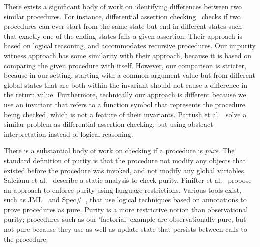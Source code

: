 There exists a significant body of work on identifying differences between
two similar procedures. For instance, differential assertion
checking~\cite{lahiri2013differential} checks if two procedures can ever
start from the same state but end in different states such that exactly one
of the ending states fails a given assertion. Their approach is based on
logical reasoning, and accommodates recursive procedures. Our impurity
witness approach has some similarity with their approach, because it is
based on comparing the given procedure with itself. However, our comparison
is stricter, because in our setting, starting with a common argument value
but from different global states that are both within the invariant should
not cause a difference in the return value. Furthermore, technically our
approach is different because we use an invariant that refers to a function
symbol that represents the procedure being checked, which is not a feature
of their invariants. Partush et al.~\cite{partush2013abstract} solve a
similar problem as differential assertion checking, but using abstract
interpretation instead of logical reasoning.

There is a substantial body of work on checking if a procedure is
\emph{pure}. The standard definition of purity is that the procedure not
modify any objects that existed before the procedure was invoked, and not
modify any  global variables. Salcianu et
al.~\cite{sualcianu2005purity} describe a static analysis to check purity.
Finifter et al.~\cite{finifter2008verifiable} propose an approach to
enforce purity using language restrictions. Various tools exist, such as
JML~\cite{leavens2008jml} and Spec\#~\cite{specSharp}, that use logical
techniques based on annotations to prove procedures as pure.  Purity is a
more restrictive notion than observational purity; procedures such
as our `factorial' example are observationally pure, but not pure because
they use as well as update state that persists between calls to the
procedure. 


\nocite{barnett2004spec}
\nocite{lahiri2013differential}
\nocite{de2008z3}
\nocite{alpern1988detecting}
\nocite{sondergaard1990referential}
\nocite{flanagan2001avoiding}
\nocite{sualcianu2005purity}
\nocite{cytron1991efficiently}
\nocite{leino2008boogie}
